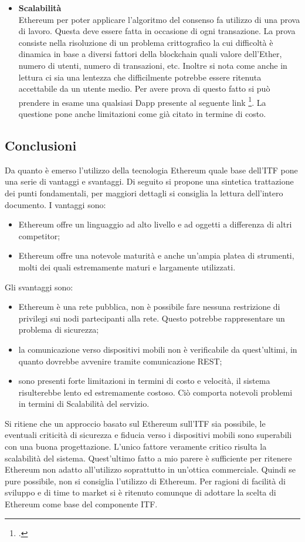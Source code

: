 \begin{itemize}
    \item \textbf{Scalabilità}\\
    Ethereum per poter applicare l’algoritmo del consenso fa utilizzo di una prova di lavoro. Questa deve essere fatta in occasione di ogni transazione. La prova consiste nella risoluzione di un problema crittografico la cui difficoltà è dinamica in base a diversi fattori della blockchain quali valore dell’Ether, numero di utenti, numero di transazioni, etc. Inoltre si nota come anche in lettura ci sia una lentezza che difficilmente potrebbe essere ritenuta accettabile da un utente medio. Per avere prova di questo fatto si può prendere in esame una qualsiasi Dapp presente al seguente link \footcite{site:state-dapps}. La questione pone anche limitazioni come già citato in termine di costo.
\end{itemize}
\subsection{Conclusioni}
Da quanto è emerso l’utilizzo della tecnologia Ethereum quale base dell’ITF pone una serie di vantaggi e svantaggi. Di seguito si propone una sintetica trattazione dei punti fondamentali, per maggiori dettagli si consiglia la lettura dell’intero documento.
I vantaggi sono:
\begin{itemize}
    \item Ethereum offre un linguaggio ad alto livello e ad oggetti a differenza di altri competitor;
    \item Ethereum offre una notevole maturità e anche un’ampia platea di strumenti, molti dei quali estremamente maturi e largamente utilizzati.
\end{itemize}
    
Gli svantaggi sono: 
\begin{itemize}
    \item Ethereum è una rete pubblica, non è possibile fare nessuna restrizione di privilegi sui nodi partecipanti alla rete. Questo potrebbe rappresentare un problema di sicurezza;
    \item la comunicazione verso dispositivi mobili non è verificabile da quest’ultimi, in quanto dovrebbe avvenire tramite comunicazione REST;
    \item sono presenti forte limitazioni in termini di costo e velocità, il sistema risulterebbe lento ed estremamente costoso. Ciò comporta notevoli problemi in termini di Scalabilità del servizio.
\end{itemize}
Si ritiene che un approccio basato sul Ethereum sull’ITF sia possibile, le eventuali criticità di sicurezza e fiducia verso i dispositivi mobili sono superabili con una buona progettazione. L’unico fattore veramente critico risulta la scalabilità del sistema. Quest’ultimo fatto a mio parere è sufficiente per ritenere Ethereum non adatto all’utilizzo soprattutto in un’ottica commerciale. Quindi se pure possibile, non si consiglia l’utilizzo di Ethereum. Per ragioni di facilità di sviluppo e di time to market si è ritenuto comunque di adottare la scelta di Ethereum come base del componente ITF.

